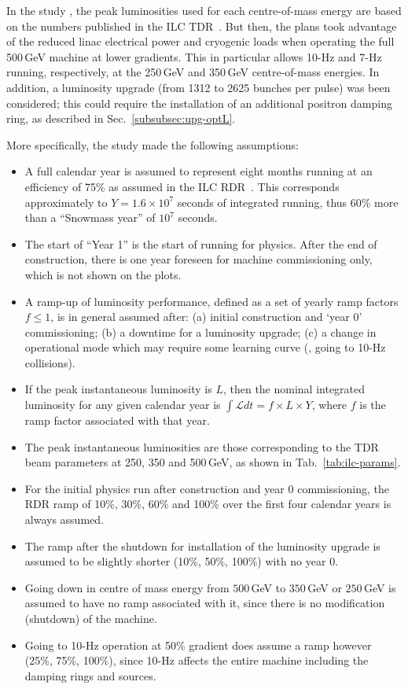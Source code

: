 In the study \cite{Barklow:2015tja}, the peak luminosities used for each centre-of-mass energy are based on the numbers published in the ILC TDR~\cite{Adolphsen:2013jya}. But then, the plans took advantage of the reduced linac  electrical power and cryogenic loads when operating the full 500\,GeV machine at lower gradients.  This in particular allows 10-Hz and 7-Hz running, respectively, at the 250\,GeV  and 350\,GeV centre-of-mass energies. In addition, a luminosity upgrade (from 1312 to 2625 bunches per pulse) was been considered; this could require the installation of an additional positron damping ring, as described in  Sec.~\ref{subsubsec:upg-optL}.

More specifically, the study \cite{Barklow:2015tja} made the following assumptions:

\begin{itemize} 
\item A full calendar year is assumed to represent eight months running at an efficiency of 75\% as assumed in the ILC RDR~\cite{Phinney:2007gp}. This corresponds approximately to $Y= 1.6 \times 10^7$ seconds of integrated
running, thus 60\% more than a ``Snowmass year'' of $10^7$ seconds.
\item The start of ``Year 1'' is the start of running for physics. After the end of construction, there is one year foreseen for machine commissioning only, which is not shown on the plots.
\item A ramp-up of luminosity performance, defined as a set of yearly ramp factors $f \le 1$, is in general assumed after: (a) initial construction and `year 0' commissioning; (b) a downtime for a luminosity upgrade; (c) a change in operational mode which may require some learning curve (\eg,  going to 10-Hz collisions).
\item If the peak instantaneous luminosity is $L$, then the nominal integrated luminosity for any given
calendar year is $\int \mathcal{L} dt = f \times L \times Y$, where $f$ is the ramp factor associated with that year.
\item The peak instantaneous luminosities are those corresponding to the TDR beam parameters at 250, 350 and 500\,GeV, as shown in Tab.~\ref{tab:ilc-params}.
\item For the initial physics run after construction and year 0 commissioning, the RDR ramp of 10\%,
30\%, 60\% and 100\% over the first four calendar years is always assumed.
\item  The ramp after the shutdown for installation of the luminosity upgrade is assumed to be slightly shorter (10\%, 50\%, 100\%) with no year 0.
\item Going down in centre of mass energy from $500$\,GeV to $350$\,GeV or $250$\,GeV is assumed to have no ramp
associated with it, since there is no modification (shutdown) of  the machine. 
\item Going to 10-Hz operation at 50\% gradient does assume a ramp however (25\%, 75\%, 100\%),
since 10-Hz affects the entire machine including the damping rings and sources.

\end{itemize}


